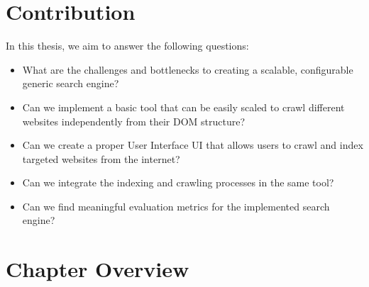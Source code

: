 \section{Contribution}

In this thesis, we aim to answer the following questions:

\begin{itemize}
  \item What are the challenges and bottlenecks to creating a scalable, configurable generic search engine?
\item Can we implement a basic tool that can be easily scaled to crawl different websites independently from their DOM structure?
    \item Can we create a proper User Interface UI that allows users to crawl and index targeted websites from the internet?
    \item Can we integrate the indexing and crawling processes in the same tool?
    \item Can we find meaningful evaluation metrics for the implemented search engine?
\end{itemize}
\section{Chapter Overview}
